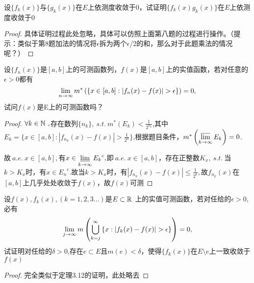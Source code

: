 设$\{f_k(x)\}$与$\{g_k(x)\}$在$E$上依测度收敛于0，试证明$\{f_k(x)g_k(x)\}$在$E$上依测度收敛于0
\begin{proof}
	具体证明过程此处忽略，具体可以仿照上面第八题的过程进行操作。（提示：类似于第8题加法的情况将$\epsilon$拆为两个$\epsilon$/2的和，那么对于此题乘法的情况呢？）
\end{proof}





设$\{f_n(x)\}$是$[a,b]$上的可测函数列，$f(x)$是$[a,b]$上的实值函数，若对任意的$\epsilon>0$都有$$\li{n\to\infty}m^{*}\left(\{ x\in[a,b]:|f_n(x)-f(x)|>\epsilon\} \right)=0 ,$$试问$f(x)$是E上的可测函数吗？
\begin{proof}
	$\forall k\in\R{N}{\ },$存在数列$\displaystyle{\{n_k\},\ s.t.\ m^{*}(E_k)<\frac{1}{2^{n_k}}}$,其中$E_k=\displaystyle{\{ x\in[a,b]:|f_{n_k}(x)-f(x)|>\frac{1}{2^n}\}}$,根据题目条件，$m^{*}\left( \varlimsup\limits_{k\to\infty}E_k\right)=0 $.\par 
	故$\ a.e.\ x\in [a,b], $有$x \in \varliminf\limits_{k\to \infty}{E_k}^{c},$即$\ a.e.\ x\in [a,b]$，存在正整数$K_x,\ s.t.\ $当$k>K_x$时，有$x\in {E_n}^{c}$.故当$k>K_x$时，有$|f_{n_k}(x)-f(x)|\leq \frac{1}{2^k},$故$f_{n_k}(x)$在$[a,b]$上几乎处处收敛于$f(x)$，故$f(x)$可测
\end{proof}

设$f(x),f_k(x),(k=1,2,3...)$是$E\subset\R{R}{\ }$上的实值可测函数，若对任给的$\epsilon>0$,必有$$\li{j\to\infty}m\left( \bigcup_{k=j}^{\infty}\left\lbrace x:|f_k(x)-f(x)|>\epsilon\right\rbrace \right)=0,$$试证明对任给的$\delta>0$,存在$e\subset E$且$m(e)<\delta$，使得$\{f_k(x)\}$在$E\setminus e$上一致收敛于$f(x)$
\begin{proof}
	完全类似于定理3.12的证明，此处略去
\end{proof}